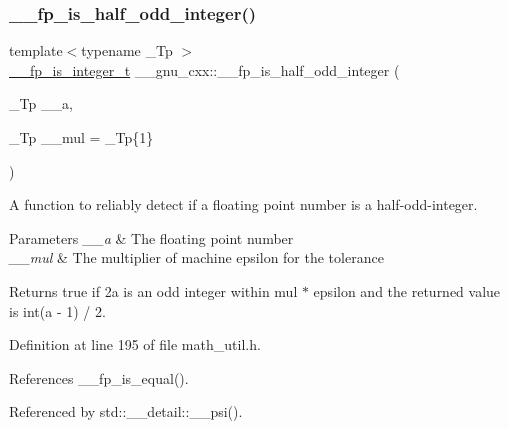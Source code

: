 \subsubsection{\texorpdfstring{\+\_\+\+\_\+fp\+\_\+is\+\_\+half\+\_\+odd\+\_\+integer()}{\_\_fp\_is\_half\_odd\_integer()}}
{\footnotesize\ttfamily template$<$typename \+\_\+\+Tp $>$ \\
\hyperlink{struct____gnu__cxx_1_1____fp__is__integer__t}{\+\_\+\+\_\+fp\+\_\+is\+\_\+integer\+\_\+t} \+\_\+\+\_\+gnu\+\_\+cxx\+::\+\_\+\+\_\+fp\+\_\+is\+\_\+half\+\_\+odd\+\_\+integer (\begin{DoxyParamCaption}\item[{\+\_\+\+Tp}]{\+\_\+\+\_\+a,  }\item[{\+\_\+\+Tp}]{\+\_\+\+\_\+mul = {\ttfamily \+\_\+Tp\{1\}} }\end{DoxyParamCaption})\hspace{0.3cm}{\ttfamily [inline]}}

A function to reliably detect if a floating point number is a half-\/odd-\/integer.


\begin{DoxyParams}{Parameters}
{\em \+\_\+\+\_\+a} & The floating point number \\
\hline
{\em \+\_\+\+\_\+mul} & The multiplier of machine epsilon for the tolerance \\
\hline
\end{DoxyParams}
\begin{DoxyReturn}{Returns}
{\ttfamily true} if 2a is an odd integer within mul $\ast$ epsilon and the returned value is int(a -\/ 1) / 2. 
\end{DoxyReturn}


Definition at line 195 of file math\+\_\+util.\+h.



References \+\_\+\+\_\+fp\+\_\+is\+\_\+equal().



Referenced by std\+::\+\_\+\+\_\+detail\+::\+\_\+\+\_\+psi().

\mbox{\label{namespace____gnu__cxx_a75c2c5ab6f25d41dddd3d00235593211}} 
